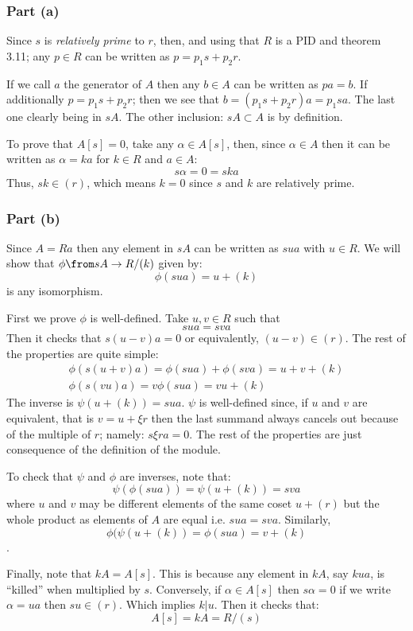 \subsubsection*{Part (a)}
Since $s$ is \emph{relatively prime} to $r$, then, and using that $R$ is a PID and theorem 3.11; any $p\in R$ can be written as $p=p_1 s+ p_2 r$. 

If we call $a$ the generator of $A$ then any $b\in A$ can be written as $pa=b$. If additionally $p=p_1 s+ p_2 r$; then we see that $b=(p_1s+ p_2 r)a=p_1sa$. The last one clearly being in $sA$. The other inclusion: $sA\subset A$ is by definition.

To prove that $A[s]=0$, take any $\alpha \in A[s]$, then, since $\alpha \in A$ then it can be written as $\alpha=ka$ for $k\in R$ and $a\in A$:
$$s\alpha=0=ska$$
Thus, $sk\in (r)$, which means $k=0$ since $s$ and $k$ are relatively prime.

\subsubsection*{Part (b)}
Since $A=Ra$ then any element in $sA$ can be written as $sua$ with $u\in R$. We will show that $\phi \from sA \to R/(k)$ given by:
$$\phi(sua)= u+(k)$$
is any isomorphism.

First we prove $\phi$ is well-defined. Take $u,v\in R$ such that
$$sua = sva$$
Then it checks that $s(u-v)a= 0$ or equivalently, $(u-v)\in ( r)$.
The rest of the properties are quite simple:
\begin{gather*}
\phi(s(u+v)a)= \phi(sua) + \phi(sva)= u+v+(k)\\
\phi(s(vu)a)= v\phi(sua)= vu+(k)
\end{gather*}
The inverse is $\psi(u+(k)) = sua$. $\psi$ is well-defined since, if $u$ and $v$ are equivalent, that is $v=u+\xi r$ then the last summand always cancels out because of the multiple of $r$; namely: $s\xi r a=0$. The rest of the properties are just consequence of the definition of the module.

To check that $\psi$ and $\phi$ are inverses, note that:
$$\psi(\phi(sua))= \psi(u+(k))= sva$$
where $u$ and $v$ may be different elements of the same coset $u+(r)$ but the whole product as elements of $A$ are equal i.e. $sua = sva$. Similarly, 
$$\phi(\psi(u+(k))= \phi(sua) =v+(k)$$.

Finally, note that $kA=A[s]$. This is because any element in $kA$, say $kua$, is ``killed'' when multiplied by $s$. Conversely, if $\alpha\in A[s]$ then $s\alpha=0$ if we write $\alpha = ua$ then $su\in (r)$. Which implies $k|u$. Then it checks that: 
$$A[s] = kA = R/(s)$$

